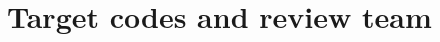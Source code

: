 


\renewcommand{\longname}{IO }
\renewcommand{\funcname}{ IO }
\renewcommand{\shortname}{IO}
\renewcommand{\myauthors}{Leonid Zaslavsky, Arlindo da Silva, Michael
Young, 
Mark Iredell}

\setcounter{section}{0}
\renewcommand{\thesection}{\arabic{section}}
\renewcommand{\thesubsection}{\arabic{section}.\arabic{subsection}}
\renewcommand{\thesubsubsection}{\arabic{section}.\arabic{subsection}.\arabic{subsubsection}}

%


%


\section{Target codes and review team}

